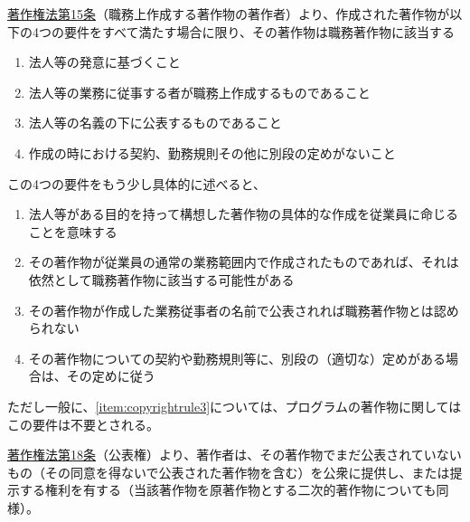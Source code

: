 \clearpage
\href{https://elaws.e-gov.go.jp/document?lawid=345AC0000000048\#Mp-At_15}{著作権法第15条}（職務上作成する著作物の著作者）より、作成された著作物が以下の4つの要件をすべて満たす場合に限り、その著作物は職務著作物に該当する
\begin{enumerate}[label=\Roman*, ref=\Roman*]
\item 法人等の発意に基づくこと
\item 法人等の業務に従事する者が職務上作成するものであること
\item\label{item:copyrightrule3} 法人等の名義の下に公表するものであること
\item 作成の時における契約、勤務規則その他に別段の定めがないこと
\end{enumerate}
この4つの要件をもう少し具体的に述べると、
\begin{enumerate}[label=\Roman*$'$]
\item 法人等がある目的を持って構想した著作物の具体的な作成を従業員に命じることを意味する
\item その著作物が従業員の通常の業務範囲内で作成されたものであれば、それは依然として職務著作物に該当する可能性がある
\item その著作物が作成した業務従事者の名前で公表されれば職務著作物とは認められない
\item その著作物についての契約や勤務規則等に、別段の（適切な）定めがある場合は、その定めに従う
\end{enumerate}
ただし一般に、\ref{item:copyrightrule3}{}については、プログラムの著作物に関してはこの要件は不要とされる。



\clearpage
\href{https://elaws.e-gov.go.jp/document?lawid=345AC0000000048\#Mp-At_18}{著作権法第18条}（公表権）より、著作者は、その著作物でまだ公表されていないもの（その同意を得ないで公表された著作物を含む）を公衆に提供し、または提示する権利を有する（当該著作物を原著作物とする二次的著作物についても同様）。


